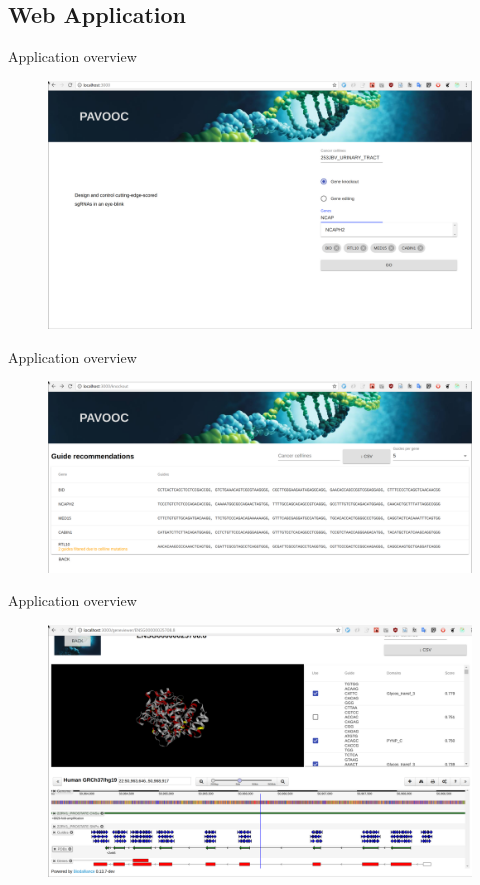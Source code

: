 \documentclass[Nike]{tuberlinbeamer}
\begin{document}

\subsection{Web Application}

\begin{frame}[fragile]{Application overview}
  \begin{figure}
    \centering
    \includegraphics[width=0.8\linewidth]{firstpage.png}
  \end{figure}
\end{frame}

\begin{frame}[fragile]{Application overview}
  \begin{figure}
    \centering
    \includegraphics[width=0.8\linewidth]{secondpage.png}
  \end{figure}
\end{frame}


\begin{frame}[fragile]{Application overview}
  \begin{figure}
    \centering
    \includegraphics[width=0.8\linewidth]{pagethree.png}
  \end{figure}
\end{frame}
\end{document}
